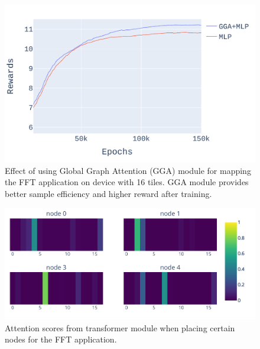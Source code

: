 \begin{figure}[tb]
  \centering
  \includegraphics[width=\linewidth]{fig/plot_gnn_atten_ppo.pdf}
  \caption{Effect of using Global Graph Attention (GGA) module for mapping the FFT application on device with 16 tiles. 
  GGA module provides better sample efficiency and higher reward after training. }
  \label{fig:ifft_rewards}
\end{figure}

\begin{figure}[tb]
  \centering
  \includegraphics[width=\linewidth]{fig/ifft_attention.pdf}
  \caption{Attention scores from transformer module when placing certain nodes for the FFT application. }
  \label{fig:ifft_attention}
\end{figure}

